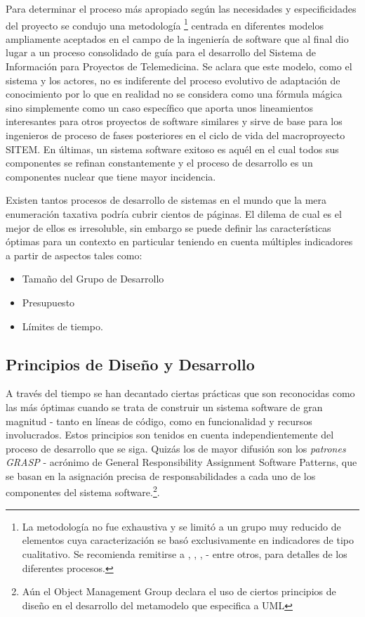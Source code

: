 Para determinar el proceso más apropiado según las necesidades y especificidades del proyecto se condujo una metodología \footnote{La metodología no fue exhaustiva y se limitó a un grupo muy reducido de elementos cuya caracterización se basó exclusivamente en indicadores de tipo cualitativo. Se recomienda remitirse a \cite{carty}, \cite{pressman}, \cite{jacobson2000}, \cite{koch} - entre otros, para detalles de los diferentes procesos.} centrada en diferentes modelos ampliamente aceptados en el campo de la ingeniería de software que al final dio lugar a un proceso consolidado de guía para el desarrollo del Sistema de Información para Proyectos de Telemedicina. Se aclara que este modelo, como el sistema y los actores, no es indiferente del proceso evolutivo de adaptación de conocimiento por lo que en realidad no se considera como una fórmula mágica sino simplemente como un caso específico que aporta unos lineamientos interesantes para otros proyectos de software similares y sirve de base para los ingenieros de proceso de fases posteriores en el ciclo de vida del macroproyecto SITEM. En últimas, un sistema software exitoso es aquél en el cual todos sus componentes se refinan constantemente y el proceso de desarrollo es un componentes nuclear que tiene mayor incidencia.

Existen tantos procesos de desarrollo de sistemas en el mundo que la mera enumeración taxativa podría cubrir cientos de páginas. El dilema de cual es el mejor de ellos es irresoluble, sin embargo se puede definir las características óptimas para un contexto en particular teniendo en cuenta múltiples indicadores a partir de aspectos tales como:

\begin{itemize}
 \item Tamaño del Grupo de Desarrollo
 \item Presupuesto
 \item Límites de tiempo.
 \ 
\end{itemize}

\subsection{Principios de Diseño y Desarrollo}

A través del tiempo se han decantado ciertas prácticas que son reconocidas como las más óptimas cuando se trata de construir un sistema software de gran magnitud - tanto en líneas de código, como en funcionalidad y recursos involucrados. Estos principios son tenidos en cuenta independientemente del proceso de desarrollo que se siga. Quizás los de mayor difusión son los \textit{patrones GRASP} - acrónimo de General Responsibility Assignment Software Patterns, que se basan en la asignación precisa de responsabilidades a cada uno de los componentes del sistema software.\footnote{Aún el Object Management Group declara el uso de ciertos principios de diseño en el desarrollo del metamodelo que especifica a UML}.

